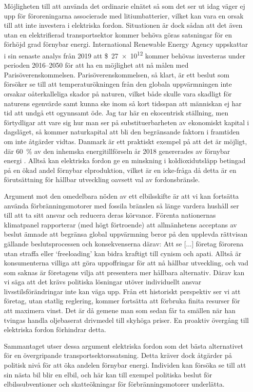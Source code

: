\documentclass{article}
\begin{document}
Möjligheten till att använda det ordinarie elnätet så som det ser ut idag
väger ej upp för föroreningarna associerade med litiumbatterier,
vilket kan vara en orsak till att inte investera i elektriska fordon.
Situationen är dock sådan att det även utan en elektrifierad transportsektor
kommer behöva göras satsningar för en förhöjd grad förnybar energi.
International Renewable Energy Agency uppskattar i sin senaste analys från 2019 \autocite{gielen19}
att \SI{27e12}[\$]{} kommer behövas investeras under perioden \numrange{2016}{2050}
för att ha en möjlighet att nå målen med Parisöverenskommelsen.
Parisöverenskommelsen, så klart, är ett beslut som försöker se till att
temperaturökningen från den globala uppvärmningen
inte orsakar oåterkalleliga skador på naturen,
vilket både skulle vara skadligt för naturens egenvärde
samt kunna ske inom så kort tidsspan att människan ej har tid
att undgå ett ogynnsamt öde.
Jag tar här en ekocentrisk ställning,
men förtydligar att vare sig hur man ser på substituerbarheten av ekonomiskt kapital i dagsläget,
så kommer naturkapital att bli den begränsande faktorn i framtiden om inte åtgärder vidtas.
Danmark är ett praktiskt exempel på att det är möjligt,
där \SI{60}{\percent} av den inhemska energitillförseln år 2018 genererades av förnybar energi
\autocite{energyindenmark2018}.
Alltså kan elektriska fordon ge en minskning i koldioxidutsläpp
betingad på en ökad andel förnybar elproduktion,
vilket är en icke-fråga då detta är en förutsättning för hållbar utveckling
oavsett val av fordonsbränsle.

Argument mot den omedelbara nöden av ett elbilsskifte är att vi kan
fortsätta använda förbränningsmotorer med fossila bränslen
så länge vardera hushåll ser till att ta sitt ansvar och
reducera deras körvanor.
Förenta nationernas klimatpanel rapporterar \autocite{edenhofer15} (med högt förtroende)
att allmänhetens acceptans av beslut ämnade att begränsa global uppvärmning
beror på den upplevda rättvisan gällande beslutsprocessen och konsekvenserna därav:
Att se [...] företag förorena utan straffa eller `freeloading'
kan bidra kraftigt till cynism och apati.
Alltså är konsumenterna villiga att göra uppoffringar för att nå hållbar utveckling,
och vad som saknas är företagens vilja att presentera mer hållbara alternativ.
Därav kan vi säga att det krävs politiska lösningar utöver individuellt ansvar
livsstilsförändringar inte kan väga upp.
Från ett historiskt perspektiv ser vi att företag, utan statlig reglering,
kommer fortsätta att förbruka finita resurser för att maximera vinst.
Det är då gemene man som sedan får ta smällen när han tvingas handla
oljebaserat drivmedel till skyhöga priser.
En proaktiv övergång till elektriska fordon förhindrar detta.

Sammantaget utser dessa argument elektriska fordon som det bästa alternativet
för en övergripande transportsektorssatsning.
Detta kräver dock åtgärder på politisk nivå för att öka andelen förnybar energi.
Individen kan försöka se till att sin nästa bil blir en elbil,
och här kan till exempel politiska beslut för elbilssubventioner
och skatteökningar för förbränningsmotorer underlätta.

\printbibliography
\end{document}
